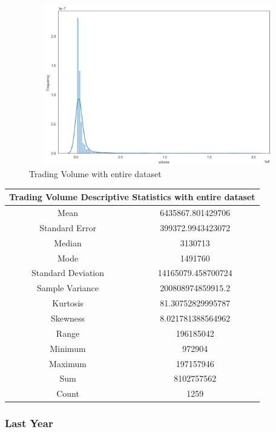 \begin{figure}[h!]
\centering
\includegraphics[width=15cm,height=7cm,keepaspectratio]{resultsEvaluation/volumeDescMax.png}
\caption{Trading Volume with entire dataset}
\label{fig:appendix_volumeDescMax}
\end{figure}
\begin{center}
\begin{tabular}{ c c }
\hline
\multicolumn{2}{|c|}{Trading Volume Descriptive Statistics with entire dataset} \\
\hline
Mean & 6435867.801429706 \\
Standard Error & 399372.9943423072 \\
Median & 3130713 \\
Mode & 1491760 \\
Standard Deviation & 14165079.458700724 \\
Sample Variance & 200808974859915.2 \\
Kurtosis & 81.30752829995787 \\
Skewness & 8.021781388564962 \\
Range & 196185042 \\
Minimum & 972904 \\
Maximum & 197157946 \\
Sum & 8102757562 \\
Count & 1259
\end{tabular}
\end{center}

\subsubsection{Last Year}

